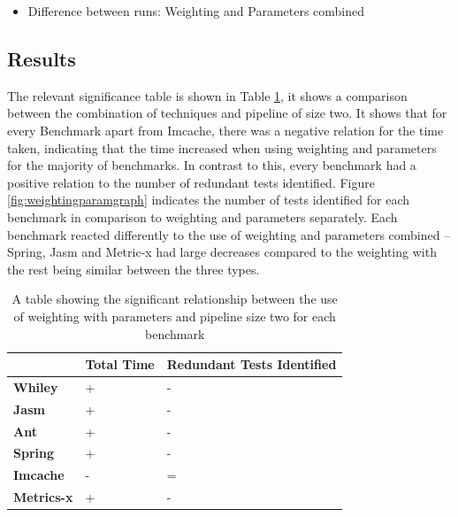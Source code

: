 \begin{itemize}
\item Difference between runs: Weighting and Parameters combined
\end{itemize}

\subsection{Results}
The relevant significance table is shown in Table \ref{weightingparamsig}, it shows a comparison between the combination of techniques and pipeline of size two. It shows that for every Benchmark apart from Imcache, there was a negative relation for the time taken, indicating that the time increased when using weighting and parameters for the majority of benchmarks. In contrast to this, every benchmark had a positive relation to the number of redundant tests identified. Figure \ref{fig:weightingparamgraph} indicates the number of tests identified for each benchmark in comparison to weighting and parameters separately. Each benchmark reacted differently to the use of weighting and parameters combined -- Spring, Jasm and Metric-x had large decreases compared to the weighting with the rest being similar between the three types. 

\begin{table}[h]
\centering

\begin{tabular}{|l|l|l|}
\hline
{\bf }          & {\bf Total Time} & {\bf Redundant Tests Identified} \\ \hline
{\bf Whiley}    & +                & -                           \\ \hline
{\bf Jasm}      & +                & -                           \\ \hline
{\bf Ant}       & +                & -                           \\ \hline
{\bf Spring}    & +                & -                           \\ \hline
{\bf Imcache}   & -                & =                           \\ \hline
{\bf Metrics-x} & +                & -                           \\ \hline
\end{tabular}
\caption{A table showing the significant relationship between the use of weighting with parameters and pipeline size two for each benchmark}
\label{weightingparamsig}
\end{table}

